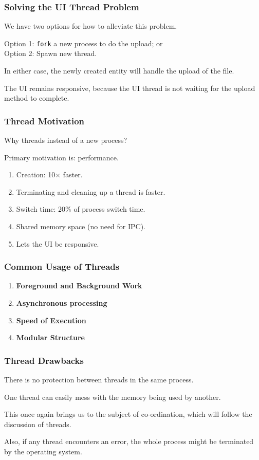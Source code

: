 \begin{frame}
	\frametitle{Solving the UI Thread Problem}

	We have two options for how to alleviate this problem.

	Option 1: \texttt{fork} a new process to do the upload; or \\
	Option 2: Spawn  new thread.

	In either case, the newly created entity will handle the upload of the file.

	The UI remains responsive, because the UI thread is not waiting for the upload method to complete.

\end{frame}

\begin{frame}
	\frametitle{Thread Motivation}
	Why threads instead of a new process?

	Primary motivation is: performance.

	\begin{enumerate}
		\item Creation: 10$\times$ faster.
		\item Terminating and cleaning up a thread is faster.
		\item Switch time: 20\% of process switch time.
		\item Shared memory space (no need for IPC).
		\item Lets the UI be responsive.
	\end{enumerate}

\end{frame}

\begin{frame}
	\frametitle{Common Usage of Threads}

	\begin{enumerate}
		\item \textbf{Foreground and Background Work}
		\item \textbf{Asynchronous processing}
		\item \textbf{Speed of Execution}
		\item \textbf{Modular Structure}
	\end{enumerate}

\end{frame}

\begin{frame}
	\frametitle{Thread Drawbacks}

	There is no protection between threads in the same process.

	One thread can easily mess with the memory being used by another.

	This once again brings us to the subject of co-ordination, which will follow the discussion of threads.

	Also, if any thread encounters an error, the whole process might be terminated by the operating system.

\end{frame}

